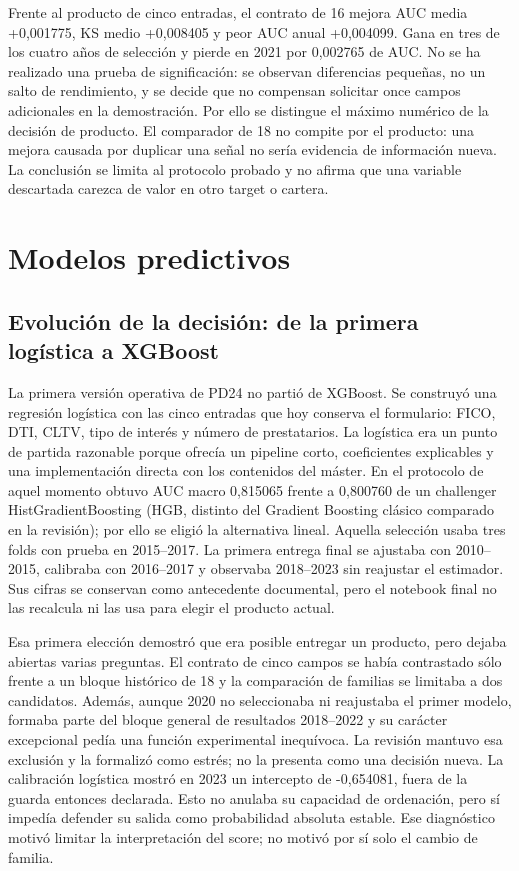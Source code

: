 \documentclass[10pt,a4paper]{article}
\newcommand{\DeltaFiveAUC}{+0,001775}
\newcommand{\DeltaFiveKS}{+0,008405}
\newcommand{\DeltaFiveWorst}{+0,004099}
\begin{document}
Frente al producto de cinco entradas, el contrato de 16 mejora AUC media
\DeltaFiveAUC{}, KS medio \DeltaFiveKS{} y peor AUC anual
\DeltaFiveWorst{}. Gana en tres de los cuatro años de selección y pierde en 2021
por 0,002765 de AUC. No se ha realizado una prueba de significación: se observan
diferencias pequeñas, no un salto de rendimiento, y se decide que no compensan
solicitar once campos adicionales en la demostración. Por ello se
distingue el máximo numérico de la decisión de producto. El comparador
de 18 no compite por el producto: una mejora causada por duplicar una señal no
sería evidencia de información nueva. La conclusión se limita al protocolo
probado y no afirma que una variable descartada carezca de valor en otro target
o cartera.

\clearpage
\section{Modelos predictivos}

\subsection{Evolución de la decisión: de la primera logística a XGBoost}

La primera versión operativa de PD24 no partió de XGBoost. Se construyó una
regresión logística con las cinco entradas que hoy conserva el formulario:
FICO, DTI, CLTV, tipo de interés y número de prestatarios. La logística era un
punto de partida razonable porque ofrecía un pipeline corto, coeficientes
explicables y una implementación directa con los contenidos del máster. En el
protocolo de aquel momento obtuvo AUC macro 0,815065 frente a 0,800760 de un
challenger HistGradientBoosting (HGB, distinto del Gradient Boosting clásico
comparado en la revisión); por ello se eligió la alternativa lineal.
Aquella selección usaba tres folds con prueba en 2015--2017. La primera entrega
final se ajustaba con 2010--2015, calibraba con 2016--2017 y observaba 2018--2023
sin reajustar el estimador. Sus cifras se conservan como antecedente documental,
pero el notebook final no las recalcula ni las usa para elegir el producto actual.

Esa primera elección demostró que era posible entregar un producto, pero dejaba
abiertas varias preguntas. El contrato de cinco campos se había contrastado sólo
frente a un bloque histórico de 18 y la comparación de familias se limitaba a
dos candidatos. Además, aunque 2020 no seleccionaba ni reajustaba el primer
modelo, formaba parte del bloque general de resultados 2018--2022 y su carácter
excepcional pedía una función experimental inequívoca. La revisión mantuvo esa
exclusión y la formalizó como estrés; no la presenta como una decisión nueva. La
calibración logística
mostró en 2023 un intercepto de -0,654081, fuera de la guarda entonces declarada.
Esto no anulaba su capacidad de ordenación, pero sí impedía defender su salida
como probabilidad absoluta estable. Ese diagnóstico motivó limitar la
interpretación del score; no motivó por sí solo el cambio de familia.
\end{document}
